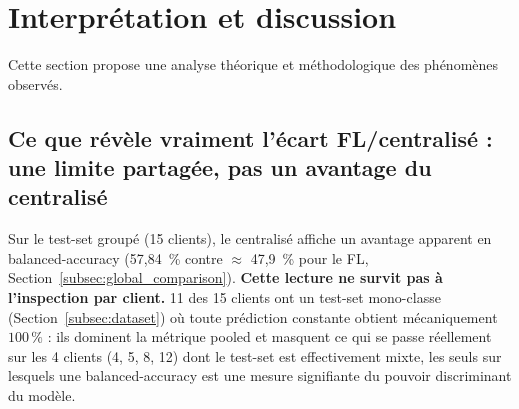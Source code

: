 \documentclass{article}
\begin{document}
\section{Interprétation et discussion}
\label{sec:discussion}

Cette section propose une analyse théorique et méthodologique des phénomènes observés.

\subsection{Ce que révèle vraiment l'écart FL/centralisé : une limite partagée, pas un
avantage du centralisé}
\label{subsec:why_cent_wins}

Sur le test-set groupé (15 clients), le centralisé affiche un avantage apparent en
balanced-accuracy (57,84~\% contre $\approx$ 47,9~\% pour le FL,
Section~\ref{subsec:global_comparison}). \textbf{Cette lecture ne survit pas à
l'inspection par client.} 11 des 15 clients ont un test-set mono-classe
(Section~\ref{subsec:dataset}) où toute prédiction constante obtient mécaniquement
$100\,\%$ : ils dominent la métrique pooled et masquent ce qui se passe réellement sur
les 4 clients (4, 5, 8, 12) dont le test-set est effectivement mixte, les seuls sur
lesquels une balanced-accuracy est une mesure signifiante du pouvoir discriminant du
modèle.
\end{document}

